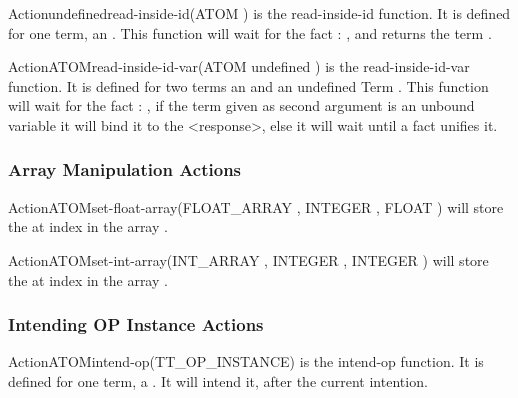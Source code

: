 \begin{typeefa}{Action}{undefined}{read-inside-id}{(ATOM )}
is the read-inside-id function. It is defined for one term, an . This
function will wait for the fact : , and
returns the term .
\end{typeefa}

\begin{typeefa}{Action}{ATOM}{read-inside-id-var}{(ATOM  undefined )}
is the read-inside-id-var function. It is defined for two
terms an   and an undefined Term .  This
function will wait for the fact : , if
the term  given as second argument is an unbound variable it
will bind it to the <response>, else it will wait until a fact unifies it.
\end{typeefa}

\subsubsection{Array Manipulation Actions}

\begin{typeefa}{Action}{ATOM}{set-float-array}{(FLOAT\_ARRAY ,
INTEGER , FLOAT )}
will store the   at index  in the array
.
\end{typeefa}

\begin{typeefa}{Action}{ATOM}{set-int-array}{(INT\_ARRAY ,
INTEGER , INTEGER )}
will store the   at index  in the array
.
\end{typeefa}

\subsubsection{Intending OP Instance Actions}

\begin{typeefa}{Action}{ATOM}{intend-op}{(TT\_OP\_INSTANCE)}
is the intend-op function. It is defined for one term, a . It will intend it, after the current intention.
\end{typeefa}

